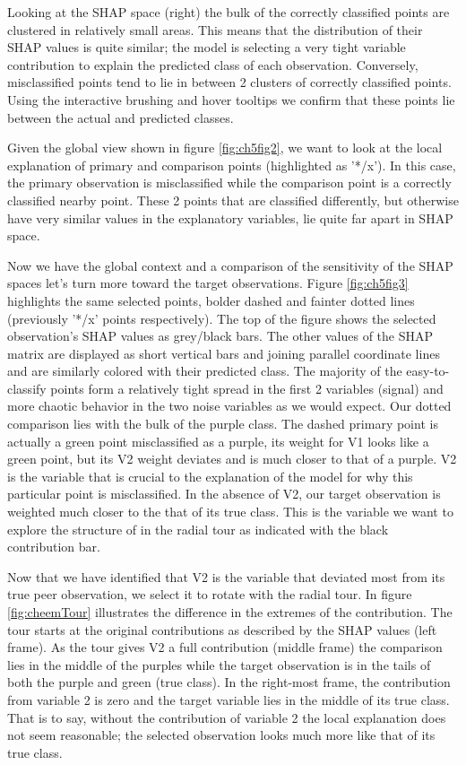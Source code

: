 \documentclass{template/monashthesis}
\begin{document}
Looking at the SHAP space (right) the bulk of the correctly classified points are clustered in relatively small areas. This means that the distribution of their SHAP values is quite similar; the model is selecting a very tight variable contribution to explain the predicted class of each observation. Conversely, misclassified points tend to lie in between 2 clusters of correctly classified points. Using the interactive brushing and hover tooltips we confirm that these points lie between the actual and predicted classes.

Given the global view shown in figure \ref{fig:ch5fig2}, we want to look at the local explanation of primary and comparison points (highlighted as '*/x'). In this case, the primary observation is misclassified while the comparison point is a correctly classified nearby point. These 2 points that are classified differently, but otherwise have very similar values in the explanatory variables, lie quite far apart in SHAP space.

Now we have the global context and a comparison of the sensitivity of the SHAP spaces let's turn more toward the target observations. Figure \ref{fig:ch5fig3} highlights the same selected points, bolder dashed and fainter dotted lines (previously '*/x' points respectively). The top of the figure shows the selected observation's SHAP values as grey/black bars. The other values of the SHAP matrix are displayed as short vertical bars and joining parallel coordinate lines and are similarly colored with their predicted class. The majority of the easy-to-classify points form a relatively tight spread in the first 2 variables (signal) and more chaotic behavior in the two noise variables as we would expect. Our dotted comparison lies with the bulk of the purple class. The dashed primary point is actually a green point misclassified as a purple, its weight for V1 looks like a green point, but its V2 weight deviates and is much closer to that of a purple. V2 is the variable that is crucial to the explanation of the model for why this particular point is misclassified. In the absence of V2, our target observation is weighted much closer to the that of its true class. This is the variable we want to explore the structure of in the radial tour as indicated with the black contribution bar.

Now that we have identified that V2 is the variable that deviated most from its true peer observation, we select it to rotate with the radial tour. In figure \ref{fig:cheemTour} illustrates the difference in the extremes of the contribution. The tour starts at the original contributions as described by the SHAP values (left frame). As the tour gives V2 a full contribution (middle frame) the comparison lies in the middle of the purples while the target observation is in the tails of both the purple and green (true class). In the right-most frame, the contribution from variable 2 is zero and the target variable lies in the middle of its true class. That is to say, without the contribution of variable 2 the local explanation does not seem reasonable; the selected observation looks much more like that of its true class.
\end{document}
